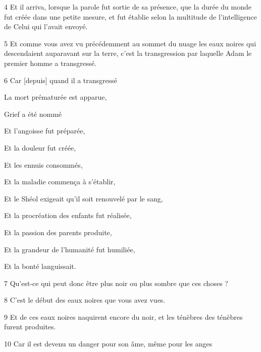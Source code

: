 \par 4 Et il arriva, lorsque la parole fut sortie de sa présence, que la durée du monde fut créée dans une petite mesure, et fut établie selon la multitude de l'intelligence de Celui qui l'avait envoyé.

\par 5 Et comme vous avez vu précédemment au sommet du nuage les eaux noires qui descendaient auparavant sur la terre, c'est la transgression par laquelle Adam le premier homme a transgressé.

\par 6 Car [depuis] quand il a transgressé

\par La mort prématurée est apparue,

\par Grief a été nommé

\par Et l'angoisse fut préparée,

\par Et la douleur fut créée,

\par Et les ennuis consommés,

\par Et la maladie commença à s'établir,

\par Et le Shéol exigeait qu'il soit renouvelé par le sang,

\par Et la procréation des enfants fut réalisée,

\par Et la passion des parents produite,

\par Et la grandeur de l'humanité fut humiliée,

\par Et la bonté languissait.

\par 7 Qu'est-ce qui peut donc être plus noir ou plus sombre que ces choses ?

\par 8 C'est le début des eaux noires que vous avez vues.

\par 9 Et de ces eaux noires naquirent encore du noir, et les ténèbres des ténèbres furent produites.

\par 10 Car il est devenu un danger pour son âme, même pour les anges

